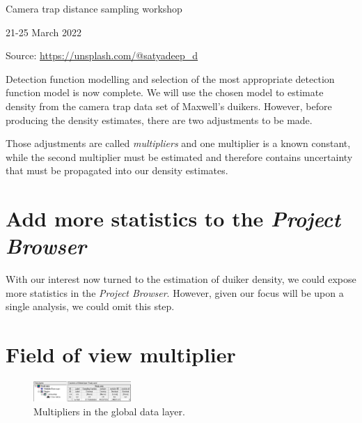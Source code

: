 \documentclass[a4paper, 10pt]{article}
\begin{document}
\phantom{a}

\vspace{4.7cm}

{\Large Camera trap distance sampling workshop}

{\large 21-25 March 2022}

\begin{flushright}
\tiny{Source: \url{https://unsplash.com/@satyadeep_d}}
\end{flushright}

%
{%
}

Detection function modelling and selection of the most appropriate detection function model is now complete.  We will use the chosen model to estimate density from the camera trap data set of Maxwell's duikers.  However, before producing the density estimates, there are two adjustments to be made.

Those adjustments are called \emph{multipliers} and one multiplier is a known constant, while the second multiplier must be estimated and therefore contains uncertainty that must be propagated into our density estimates.

\section{Add more statistics to the \emph{Project Browser}}

With our interest now turned to the estimation of duiker density, we could expose more statistics in the \emph{Project Browser}.  However, given our focus will be upon a single analysis, we could omit this step.

\section{Field of view multiplier}

\begin{figure}
\includegraphics[width=0.33\textwidth]{images/global-data.png}
\caption{Multipliers in the global data layer. \label{fig:globaldata}}
\vspace{-25pt}
\end{figure}
\end{document}
